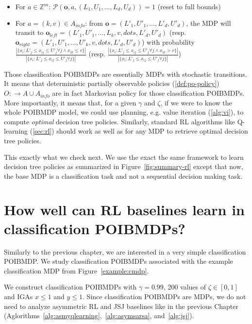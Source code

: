 \begin{definition}
\begin{itemize}
        \begin{itemize}
            \item For $a \in \mathbb{Z}^m$: $\mathcal{P}(\boldsymbol{o}, a, (L_1, U_1, \dots, L_d, U_d)) = 1$ (reset to full bounds)
            \item For $a = (k, v) \in A_{info}$: from $\boldsymbol{o}=(L'_1, U'_1, \dots, L'_d, U'_d)$, the MDP will transit to $\boldsymbol{o}_{left} = (L'_1, U'_1, \dots, L_k, v, dots, L'_d, U'_d)$ (resp. $\boldsymbol{o}_{right} = (L'_1, U'_1, \dots, U'_k, v, dots, L'_d, U'_d)$) with probability $\frac{|\{{x}_i: L'_j \leq x_{ij} \leq U'_j \forall j \land x_{ik} \leq v\}|}{|\{x_i: L'_j \leq x_{ij} \leq U'_j \forall j\}|}$ (resp. $\frac{|\{x_i: L'_j \leq x_{ij} \leq U'_j \forall j \land x_{ik} > v\}|}{|\{x_i: L'_j \leq x_{ij} \leq U'_j \forall j\}|}$)
        \end{itemize}
    \end{itemize}
\end{definition}

Those classification POIBMDPs are essentially MDPs with stochastic transitions.
It means that deterministic partially observable policies (\ref{def:po-policy}) $O:\rightarrow A\cup A_{info}$ are in fact Markovian policy for those classification POIBMDPs.
More importantly, it means that, for a given $\gamma$ and $\zeta$, if we were to know the whole POIBMDP model, we could use planning, e.g. value iteration (\ref{alg:vi}), to compute \textit{optimal} decision tree policies.
Similarly, standard RL algorithms like Q-learning (\ref{sec:rl}) should work as well as for any MDP to retrieve optimal decision tree policies.

This exactly what we check next.
We use the exact the same framework to learn decision tree policies as summarized in Figure~\ref{fig:summary-rl} except that now, the base MDP is a classification task and not a sequential decision making task.

\section{How well can RL baselines learn in classification POIBMDPs?}
Similarly to the previous chapter, we are interested in a very simple classification POIBMDP.
We study classification POIBMDPs associated with the example classification MDP from Figure~\ref{example:cmdp}.

We construct classification POIBMDPs with $\gamma=0.99$, 200 values of $\zeta \in [0,1]$ and IGAs $x\leq 1$ and $y\leq 1$.
Since classification POIBMDPs are MDPs, we do not need to analyze asymmetric RL and JSJ baselines like in the previous Chapter (Aglorithms~\ref{alg:asmyqlearning},~\ref{alg:asymsarsa}, and~\ref{alg:jsj}).

